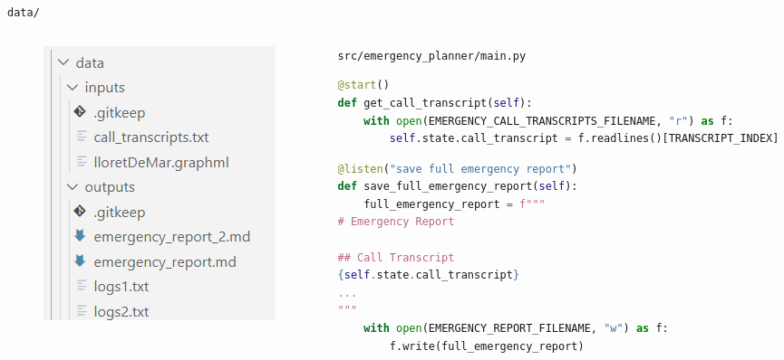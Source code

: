 \begin{frame}[fragile]{\texttt{data/}}
    \begin{columns}
        \begin{column}{0.33\textwidth}
            \begin{figure}
                \includegraphics[width=\textwidth]{figures/data_folder_structure.png}
            \end{figure}
        \end{column}
        \begin{column}{0.67\textwidth}
            \centering
            \texttt{src/emergency\_planner/main.py}
            \begin{lstlisting}[language=Python]
@start()
def get_call_transcript(self):
    with open(EMERGENCY_CALL_TRANSCRIPTS_FILENAME, "r") as f:
        self.state.call_transcript = f.readlines()[TRANSCRIPT_INDEX]
            \end{lstlisting}
            \begin{lstlisting}[language=Python]
@listen("save full emergency report")
def save_full_emergency_report(self):
    full_emergency_report = f"""
# Emergency Report

## Call Transcript
{self.state.call_transcript}
...
"""
    with open(EMERGENCY_REPORT_FILENAME, "w") as f:
        f.write(full_emergency_report)
            \end{lstlisting}
        \end{column}
    \end{columns}
\end{frame}